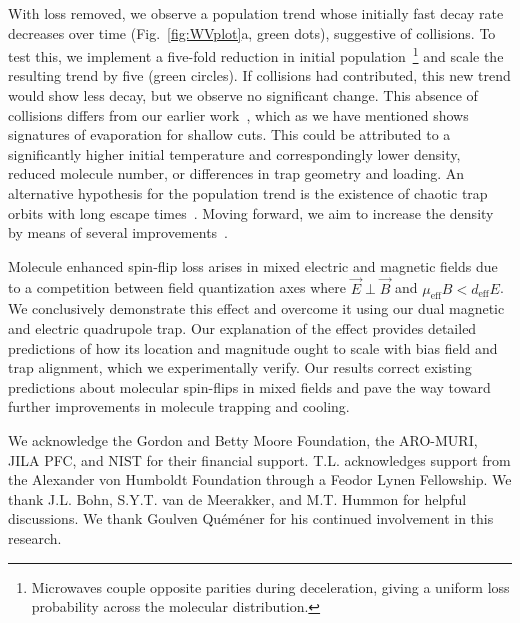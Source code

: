 \documentclass[%
 reprint,
 amsmath,amssymb,
 aps,
prl,
]{revtex4-1}
\newcommand{\red}[1]{{\color{black} #1}}
\newcommand{\epb}{{$\vec{E}\!\perp\!\vec{B}$}}
\begin{document}
With loss removed, we observe a population trend whose initially fast decay rate decreases over time (Fig.~\ref{fig:WVplot}a, green dots), suggestive of collisions. 
To test this, we implement a five-fold reduction in initial population~\footnote{Microwaves couple opposite parities during deceleration, giving a uniform loss probability across the molecular distribution.} and scale the resulting trend by five (green circles). 
If collisions had contributed, this new trend would show less decay, but we observe no significant change. 
This absence of collisions differs from our earlier work~\cite{Stuhl2012evap}, which as we have mentioned shows signatures of evaporation for shallow cuts. 
This could be attributed to a significantly higher initial temperature and correspondingly lower density, reduced molecule number, or differences in trap geometry and loading. 
\red{An alternative hypothesis for the population trend is the existence of chaotic trap orbits with long escape times~\cite{Gonzalez-Ferez2014}.} 
Moving forward, we aim to increase the density by means of several improvements~\cite{Even2015,Segev2017}.

Molecule enhanced spin-flip loss arises in mixed electric and magnetic fields due to a competition between field quantization axes where \epb{} and $\mu_\text{eff}B<d_\text{eff}E$. 
We conclusively demonstrate this effect and overcome it using our dual magnetic and electric quadrupole trap. 
Our explanation of the effect provides detailed predictions of how its location and magnitude ought to scale with bias field and trap alignment, which we experimentally verify. 
Our results correct existing predictions about molecular spin-flips in mixed fields and pave the way toward further improvements in molecule trapping and cooling.

\acknowledgements
We acknowledge the Gordon and Betty Moore Foundation, the ARO-MURI, JILA PFC, and NIST for their financial support. 
T.L. acknowledges support from the Alexander von Humboldt Foundation through a Feodor Lynen Fellowship. 
We thank J.L. Bohn, S.Y.T. van de Meerakker, and M.T. Hummon for helpful discussions. 
We thank Goulven Qu\'em\'ener for his continued involvement in this research.




\end{document}
